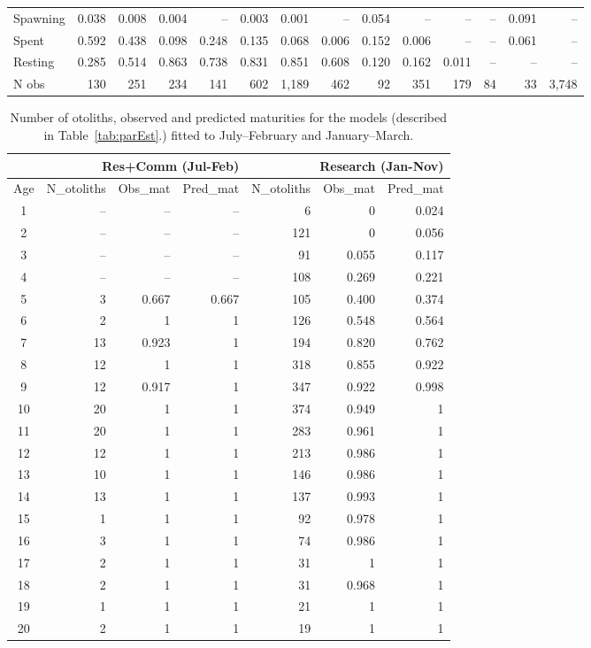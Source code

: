 \begin{table}[b]
\begin{tabular}{lrrrrrrrrrrrrr}
Spawning   & 0.038 & 0.008 & 0.004 &    -- & 0.003 & 0.001 &    -- & 0.054 &    -- &    -- &    -- & 0.091 &     -- \\
Spent      & 0.592 & 0.438 & 0.098 & 0.248 & 0.135 & 0.068 & 0.006 & 0.152 & 0.006 &    -- &    -- & 0.061 &     -- \\
Resting    & 0.285 & 0.514 & 0.863 & 0.738 & 0.831 & 0.851 & 0.608 & 0.120 & 0.162 & 0.011 &    -- &    -- &     -- \\
N obs      &   130 &   251 &   234 &   141 &   602 & 1,189 &   462 &    92 &   351 &   179 &    84 &    33 &  3,748 \\
\hline
\end{tabular}
\end{table}

\begin{table}[b]
\centering
\caption{\label{tab:maturityObsPred} Number of otoliths, observed and predicted maturities for the models (described in Table~\ref{tab:parEst}.) fitted to July--February and January--March.}
\begin{tabular}{|c|rrr|rrr|}
\hline
      & \multicolumn{3}{r|}{Res+Comm (Jul-Feb)} & \multicolumn{3}{r|}{Research (Jan-Nov)} \\
\hline
Age        & N\_otoliths & Obs\_mat & Pred\_mat & N\_otoliths & Obs\_mat & Pred\_mat \\
\hline
1  & -- &    -- &    -- &   6 &     0 & 0.024 \\
2  & -- &    -- &    -- & 121 &     0 & 0.056 \\
3  & -- &    -- &    -- &  91 & 0.055 & 0.117 \\
4  & -- &    -- &    -- & 108 & 0.269 & 0.221 \\
5  &  3 & 0.667 & 0.667 & 105 & 0.400 & 0.374 \\
6  &  2 &     1 &     1 & 126 & 0.548 & 0.564 \\
7  & 13 & 0.923 &     1 & 194 & 0.820 & 0.762 \\
8  & 12 &     1 &     1 & 318 & 0.855 & 0.922 \\
9  & 12 & 0.917 &     1 & 347 & 0.922 & 0.998 \\
10 & 20 &     1 &     1 & 374 & 0.949 &     1 \\
11 & 20 &     1 &     1 & 283 & 0.961 &     1 \\
12 & 12 &     1 &     1 & 213 & 0.986 &     1 \\
13 & 10 &     1 &     1 & 146 & 0.986 &     1 \\
14 & 13 &     1 &     1 & 137 & 0.993 &     1 \\
15 &  1 &     1 &     1 &  92 & 0.978 &     1 \\
16 &  3 &     1 &     1 &  74 & 0.986 &     1 \\
17 &  2 &     1 &     1 &  31 &     1 &     1 \\
18 &  2 &     1 &     1 &  31 & 0.968 &     1 \\
19 &  1 &     1 &     1 &  21 &     1 &     1 \\
20 &  2 &     1 &     1 &  19 &     1 &     1 \\
\hline
\end{tabular}
\end{table}

